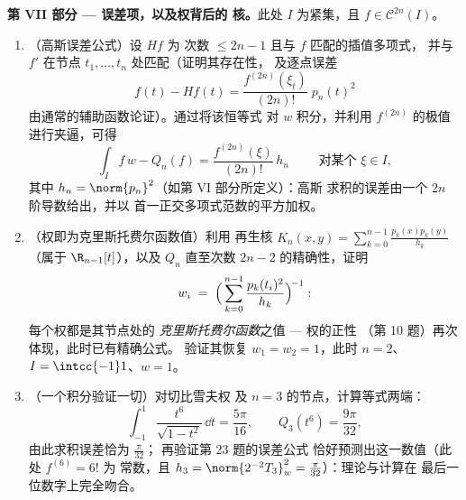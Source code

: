 \begin{problem}
\medskip
\noindent\textbf{第 VII 部分 --- 误差项，以及权背后的
核。}此处 $I$ 为紧集，且 $f \in \mathcal
C^{2n}(I)$。
\begin{enumerate}[resume]
  \item （高斯误差公式）设 $Hf$ 为
        次数 $\leq 2n - 1$ 且与 $f$ 匹配的插值多项式，
        并与 $f'$ 在节点 $t_1, \dots, t_n$ 处匹配（证明其存在性，
        及逐点误差
        \[
        f(t) - Hf(t) =
        \frac{f^{(2n)}(\xi_t)}{(2n)!}\;p_n(t)^2
        \]
        由通常的辅助函数论证）。通过将该恒等式
        对 $w$ 积分，并利用
        $f^{(2n)}$ 的极值进行夹逼，可得
        \[
        \int_I f\,w - Q_n(f)
        = \frac{f^{(2n)}(\xi)}{(2n)!}\,h_n
        \qquad\text{ 对某个 } \xi \in I,
        \]
        其中 $h_n = \norm{p_n}^2$（如第 VI 部分所定义）：高斯
        求积的误差由一个 $2n$ 阶导数给出，并以
        首一正交多项式范数的平方加权。
  \item （权即为克里斯托费尔函数值）利用
        再生核 $K_n(x, y) = \sum_{k=0}^{n-1}
        \frac{p_k(x)p_k(y)}{h_k}$（属于 $\R_{n-1}[t]$），以及
        $Q_n$ 直至次数 $2n - 2$ 的精确性，证明
        \[
        w_i \;=\;
        \Bigl(\,\sum_{k=0}^{n-1}
        \frac{p_k(t_i)^2}{h_k}\Bigr)^{\!-1} :
        \]
        每个权都是其节点处的
        \emph{克里斯托费尔函数}之值 --- 权的正性
        （第 10 题）再次体现，此时已有精确公式。
        验证其恢复 $w_1 = w_2 = 1$，此时 $n =
        2$、$I = \intcc{-1}1$、$w = 1$。
  \item （一个积分验证一切）对切比雪夫权
        及 $n = 3$ 的节点，计算等式两端：
        \[
        \int_{-1}^{1}\frac{t^6}{\sqrt{1 - t^2}}\,\dd t
        = \frac{5\pi}{16},
        \qquad
        Q_3(t^6) = \frac{9\pi}{32},
        \]
        由此求积误差恰为 $\frac{\pi}{32}$；
        再验证第 23 题的误差公式
        恰好预测出这一数值（此处 $f^{(6)} = 6!$ 为
        常数，且 $h_3 = \norm{2^{-2}T_3}_w^2 =
        \frac\pi{32}$）：理论与计算在
        最后一位数字上完全吻合。
\end{enumerate}
\end{problem}
